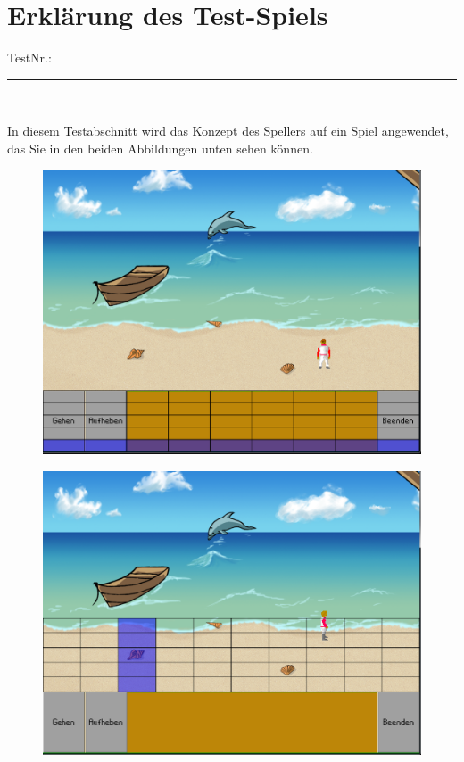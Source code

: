 \documentclass[12pt,fleqn]{scrreprt}
\begin{document}
\pagebreak
\section*{Erklärung des Test-Spiels}
\line
TestNr.: \rule{1cm}{.1pt} \\
\vspace{1cm}

In diesem Testabschnitt wird das Konzept des Spellers auf ein Spiel angewendet, 
das Sie in den beiden Abbildungen unten sehen können.


\begin{figure}[ht]
\centering
\begin{minipage}[b]{0.46\linewidth}	
\includegraphics[scale=0.28]{images/befehlsmatrix.png}
\label{control}
\end{minipage}
\quad
\begin{minipage}[b]{0.46\linewidth}
\includegraphics[scale=0.28]{images/strandmatrix.png}
\label{target}
\end{minipage}
\end{figure}
\end{document}
